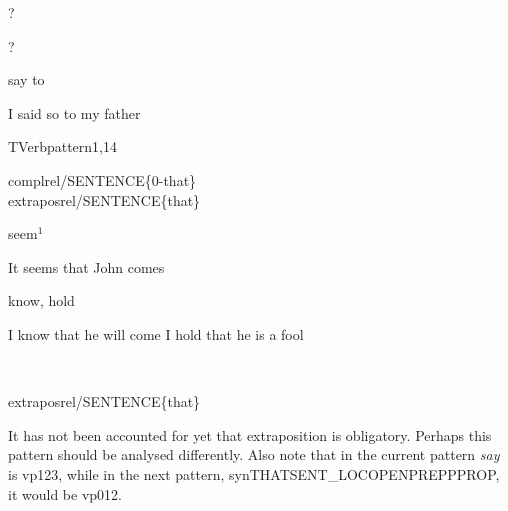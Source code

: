 
\begin{thetadescr}
\evitem ?
\esitem
     \begin{examples}
        \example  ?
     \end{examples}
\end{thetadescr}



\begin{thetadescr}
\evitem say to
\esitem
     \begin{examples}
        \example I said so to my father
     \end{examples}
\end{thetadescr}


\newpage
\verbpattern{[synTHATSENT]}
\begin{vpattern}
 TVerbpattern1,14
\csritem \mbox{}\\
     \begin{csr}
     complrel/SENTENCE\{0-that\}\\
     extraposrel/SENTENCE\{that\}
     \end{csr}
\remarksitem
\end{vpattern}


\begin{thetadescr}
\evitem seem$^{1}$
\esitem
     \begin{examples}
        \example  It seems that John comes
     \end{examples}
\end{thetadescr}


\begin{thetadescr}
\evitem know, hold
\esitem
     \begin{examples}
        \example  I know that he will come
        \example  I hold that he is a fool
     \end{examples}
\end{thetadescr}


\newpage
{}
\begin{vpattern}
 \norule
\csritem \mbox{}\\
     \begin{csr}
     extraposrel/SENTENCE\{that\}
     \end{csr}
\remarksitem It has not been accounted for yet that extraposition is obligatory. 
Perhaps this pattern should be analysed differently. Also note that in the 
current  pattern {\em say\/} is vp123, while in the next pattern, 
synTHATSENT\_LOCOPENPREPPPROP, it would be vp012.
\end{vpattern}

